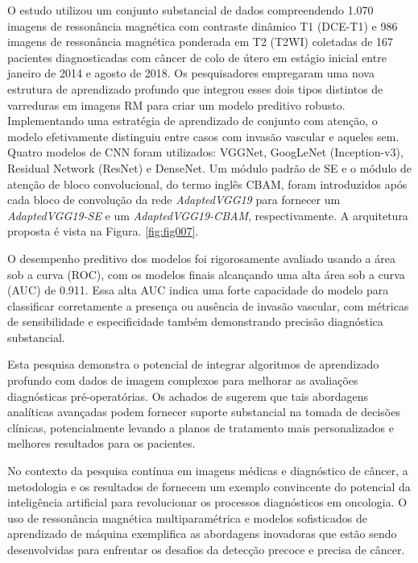 O estudo utilizou um conjunto substancial de dados compreendendo 1.070 imagens de ressonância magnética com contraste dinâmico T1 (DCE-T1) e 986 imagens de ressonância magnética ponderada em T2 (T2WI) coletadas de 167 pacientes diagnosticadas com câncer de colo de útero em estágio inicial entre janeiro de 2014 e agosto de 2018. Os pesquisadores empregaram uma nova estrutura de aprendizado profundo que integrou esses dois tipos distintos de varreduras em imagens RM para criar um modelo preditivo robusto. Implementando uma estratégia de aprendizado de conjunto com atenção, o modelo efetivamente distinguiu entre casos com invasão vascular e aqueles sem. Quatro modelos de CNN foram utilizados: VGGNet, GoogLeNet (Inception-v3), Residual Network (ResNet) e DenseNet. Um módulo padrão de \gls{SE}  e o módulo de atenção de bloco convolucional, do termo inglês \gls{CBAM},  foram introduzidos após cada bloco de convolução da rede \textit{AdaptedVGG19} para fornecer um \textit{AdaptedVGG19-SE} e um \textit{AdaptedVGG19-CBAM}, respectivamente. A arquitetura proposta é vista na Figura. \ref{fig:fig007}.

O desempenho preditivo dos modelos foi rigorosamente avaliado usando a área sob a curva (ROC), com os modelos finais alcançando uma alta área sob a curva (AUC) de 0.911. Essa alta AUC indica uma forte capacidade do modelo para classificar corretamente a presença ou ausência de invasão vascular, com métricas de sensibilidade e especificidade também demonstrando precisão diagnóstica substancial.

Esta pesquisa demonstra o potencial de integrar algoritmos de aprendizado profundo com dados de imagem complexos para melhorar as avaliações diagnósticas pré-operatórias. Os achados de \citeauthor{jiangMRIBasedRadiomics2021} sugerem que tais abordagens analíticas avançadas podem fornecer suporte substancial na tomada de decisões clínicas, potencialmente levando a planos de tratamento mais personalizados e melhores resultados para os pacientes.

No contexto da pesquisa contínua em imagens médicas e diagnóstico de câncer, a metodologia e os resultados de \citeauthor{jiangMRIBasedRadiomics2021} fornecem um exemplo convincente do potencial da inteligência artificial para revolucionar os processos diagnósticos em oncologia. O uso de ressonância magnética multiparamétrica e modelos sofisticados de aprendizado de máquina exemplifica as abordagens inovadoras que estão sendo desenvolvidas para enfrentar os desafios da detecção precoce e precisa de câncer.

